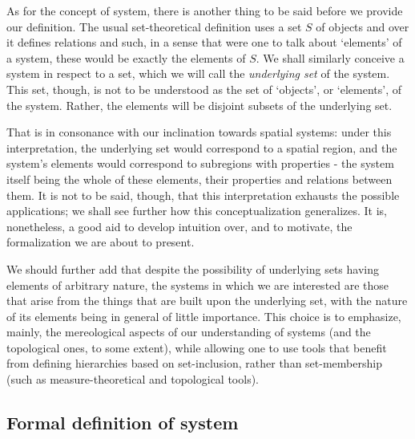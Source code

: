 As for the concept of system, there is another thing to be said before we provide our definition. The usual set-theoretical definition uses a set $S$ of objects and over it defines relations and such, in a sense that were one to talk about `elements' of a system, these would be exactly the elements of $S$. We shall similarly conceive a system in respect to a set, which we will call the \textit{underlying set} of the system. This set, though, is not to be understood as the set of `objects', or `elements', of the system. Rather, the elements will be disjoint subsets of the underlying set. 

That is in consonance with our inclination towards spatial systems: under this interpretation, the underlying set would correspond to a spatial region, and the system's elements would correspond to subregions with properties - the system itself being the whole of these elements, their properties and relations between them. It is not to be said, though, that this interpretation exhausts the possible applications; we shall see further how this conceptualization generalizes. It is, nonetheless, a good aid to develop intuition over, and to motivate, the formalization we are about to present. 

We should further add that despite the possibility of underlying sets having elements of arbitrary nature, the systems in which we are interested are those that arise from the things that are built upon the underlying set, with the nature of its elements being in general of little importance. This choice is to emphasize, mainly, the mereological aspects of our understanding of systems (and the topological ones, to some extent), while allowing one to use tools that benefit from defining hierarchies based on set-inclusion, rather than set-membership (such as measure-theoretical and topological tools).

\subsection{Formal definition of system}

